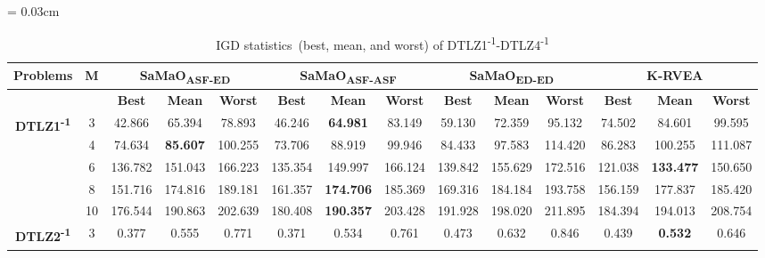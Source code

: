 \documentclass[onecolumn,10pt]{asme2ej}
\begin{document}
\begin{table}[!htb]\scriptsize
	\centering
	\caption{IGD statistics~(best, mean, and worst) of DTLZ1\textsuperscript{-1}-DTLZ4\textsuperscript{-1}}
	\label{tab:KHTTab:7}
	\tabcolsep = 0.03cm
	\begin{tabular}{|c|c|c|c|c|c|c|c|c|c|c|c|c|c|}
		\hline
		\textbf{Problems}                                     & \textbf{M} & \multicolumn{3}{c|}{\textbf{SaMaO\textsubscript{ASF-ED}}}        & \multicolumn{3}{c|}{\textbf{SaMaO\textsubscript{ASF-ASF}}}        & \multicolumn{3}{c|}{\textbf{SaMaO\textsubscript{ED-ED}}}      & \multicolumn{3}{c|}{\textbf{K-RVEA}}               \\ \hline
		& \textbf{}  & \textbf{Best} & \textbf{Mean}    & \textbf{Worst} & \textbf{Best} & \textbf{Mean}     & \textbf{Worst} & \textbf{Best} & \textbf{Mean} & \textbf{Worst} & \textbf{Best} & \textbf{Mean}     & \textbf{Worst} \\ \hline
		\multirow{5}{*}{\textbf{DTLZ1\textsuperscript{-1}}} & 3          & 42.866        & 65.394           & 78.893         & 46.246        & \textbf{64.981}   & 83.149         & 59.130        & 72.359        & 95.132         & 74.502        & 84.601            & 99.595         \\ \cline{2-14} 
		& 4          & 74.634        & \textbf{85.607}  & 100.255        & 73.706        & 88.919            & 99.946         & 84.433        & 97.583        & 114.420        & 86.283        & 100.255           & 111.087        \\ \cline{2-14} 
		& 6          & 136.782       & 151.043          & 166.223        & 135.354       & 149.997           & 166.124        & 139.842       & 155.629       & 172.516        & 121.038       & \textbf{133.477}  & 150.650        \\ \cline{2-14} 
		& 8          & 151.716       & 174.816          & 189.181        & 161.357       & \textbf{174.706}  & 185.369        & 169.316       & 184.184       & 193.758        & 156.159       & 177.837           & 185.420        \\ \cline{2-14} 
		& 10         & 176.544       & 190.863          & 202.639        & 180.408       & \textbf{190.357}  & 203.428        & 191.928       & 198.020       & 211.895        & 184.394       & 194.013           & 208.754        \\ \hline
		\multirow{5}{*}{\textbf{DTLZ2\textsuperscript{-1}}} & 3          & 0.377         & 0.555            & 0.771          & 0.371         & 0.534             & 0.761          & 0.473         & 0.632         & 0.846          & 0.439         & \textbf{0.532}    & 0.646          \\ \cline{2-14} 

\end{tabular}
\end{table}
\end{document}
